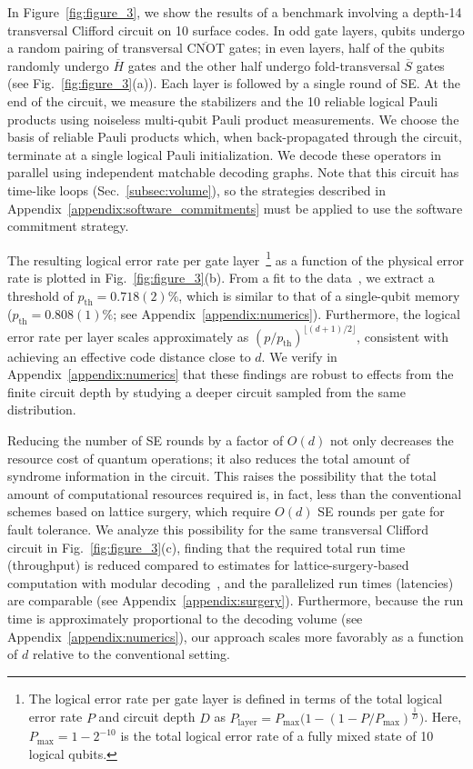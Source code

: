 \documentclass[prx,twocolumn,secnumarabic,balancelastpage,amsmath,amssymb,longbibliography]{revtex4-2}
\newcommand{\lop}[1]{\overline{#1}}
\newcommand{\lcnot}{\overline{\text{CNOT}}}
\newcommand{\pth}{p_\text{th}}
\newcommand{\pthclifforddeep}{0.718(2)\%}
\newcommand{\pthmemory}{0.808(1)\%}
\begin{document}
In Figure~\ref{fig:figure_3}, we show the results of a benchmark involving a depth-14 transversal  Clifford circuit on 10 surface codes.
% 
In odd gate layers, qubits undergo a random pairing of transversal $\lcnot$ gates; in even layers, half of the qubits randomly undergo $\lop{H}$ gates and the other half undergo fold-transversal $\lop{S}$ gates (see Fig.~\ref{fig:figure_3}(a)).
%
Each layer is followed by a single round of SE.
%
At the end of the circuit, we measure the stabilizers and the 10 reliable logical Pauli products using noiseless multi-qubit Pauli product measurements.
%
We choose the basis of reliable Pauli products which, when back-propagated through the circuit, terminate at a single logical Pauli initialization.
%
We decode these operators in parallel using independent matchable decoding graphs.
%
Note that this circuit has time-like loops (Sec.~\ref{subsec:volume}), so the strategies described in Appendix~\ref{appendix:software_commitments} must be applied to use the software commitment strategy.

The resulting logical error rate per gate layer~\footnote{The logical error rate per gate layer is defined in terms of the total logical error rate $P$ and circuit depth $D$ as \mbox{$P_\text{layer} = P_{\text{max}}\big(1 - (1 - P/P_{\text{max}})^{\frac{1}{D}}\big)
$}. 
%
Here, \mbox{$P_{\text{max}} = 1-2^{-10}$} is the total logical error rate of a fully mixed state of 10 logical qubits.} as a function of the physical error rate is plotted in Fig.~\ref{fig:figure_3}(b). 
%
From a fit to the data~\cite{wang2003confinement, watson2014logical}, we extract a threshold of \mbox{$\pth = \pthclifforddeep$}, which is similar to that of a single-qubit memory (\mbox{$\pth = \pthmemory$}; see Appendix~\ref{appendix:numerics}). 
%
Furthermore, the logical error rate per layer scales approximately as \mbox{$(p/p_{\text{th}})^{\lfloor (d+1)/2\rfloor}$}, consistent with achieving an effective code distance close to $d$.
%
We verify in Appendix~\ref{appendix:numerics} that these findings are robust to effects from the finite circuit depth by studying a deeper circuit sampled from the same distribution. 

Reducing the number of SE rounds by a factor of $O(d)$ not only decreases the resource cost of quantum operations; it also reduces the total amount of syndrome information in the circuit.
%
This raises the possibility that the total amount of computational resources required is, in fact, less than the conventional schemes based on lattice surgery, which require $O(d)$ SE rounds per gate for fault tolerance.
%
We analyze this possibility for the same transversal Clifford circuit in Fig.~\ref{fig:figure_3}(c), finding that the required total run time (throughput) is reduced compared to estimates for lattice-surgery-based computation with modular decoding~\cite{bombin2023modular}, and the parallelized run times (latencies) are comparable (see Appendix~\ref{appendix:surgery}).
%
Furthermore, because the run time is approximately proportional to the decoding volume (see Appendix~\ref{appendix:numerics}), our approach scales more favorably as a function of $d$ relative to the conventional setting.
\end{document}

